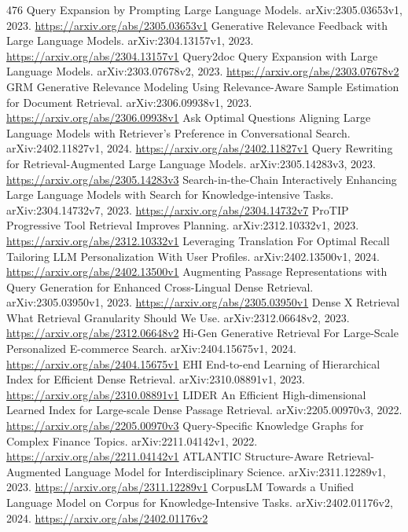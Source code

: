 \documentclass[11pt]{article}
\begin{document}
\begin{thebibliography}{476}
 Query Expansion by Prompting Large Language Models. arXiv:2305.03653v1, 2023. \url{https://arxiv.org/abs/2305.03653v1}
 Generative Relevance Feedback with Large Language Models. arXiv:2304.13157v1, 2023. \url{https://arxiv.org/abs/2304.13157v1}
 Query2doc Query Expansion with Large Language Models. arXiv:2303.07678v2, 2023. \url{https://arxiv.org/abs/2303.07678v2}
 GRM Generative Relevance Modeling Using Relevance-Aware Sample Estimation for Document Retrieval. arXiv:2306.09938v1, 2023. \url{https://arxiv.org/abs/2306.09938v1}
 Ask Optimal Questions Aligning Large Language Models with Retriever's Preference in Conversational Search. arXiv:2402.11827v1, 2024. \url{https://arxiv.org/abs/2402.11827v1}
 Query Rewriting for Retrieval-Augmented Large Language Models. arXiv:2305.14283v3, 2023. \url{https://arxiv.org/abs/2305.14283v3}
 Search-in-the-Chain Interactively Enhancing Large Language Models with Search for Knowledge-intensive Tasks. arXiv:2304.14732v7, 2023. \url{https://arxiv.org/abs/2304.14732v7}
 ProTIP Progressive Tool Retrieval Improves Planning. arXiv:2312.10332v1, 2023. \url{https://arxiv.org/abs/2312.10332v1}
 Leveraging Translation For Optimal Recall Tailoring LLM Personalization With User Profiles. arXiv:2402.13500v1, 2024. \url{https://arxiv.org/abs/2402.13500v1}
 Augmenting Passage Representations with Query Generation for Enhanced Cross-Lingual Dense Retrieval. arXiv:2305.03950v1, 2023. \url{https://arxiv.org/abs/2305.03950v1}
 Dense X Retrieval What Retrieval Granularity Should We Use. arXiv:2312.06648v2, 2023. \url{https://arxiv.org/abs/2312.06648v2}
 Hi-Gen Generative Retrieval For Large-Scale Personalized E-commerce Search. arXiv:2404.15675v1, 2024. \url{https://arxiv.org/abs/2404.15675v1}
 EHI End-to-end Learning of Hierarchical Index for Efficient Dense Retrieval. arXiv:2310.08891v1, 2023. \url{https://arxiv.org/abs/2310.08891v1}
 LIDER An Efficient High-dimensional Learned Index for Large-scale Dense Passage Retrieval. arXiv:2205.00970v3, 2022. \url{https://arxiv.org/abs/2205.00970v3}
 Query-Specific Knowledge Graphs for Complex Finance Topics. arXiv:2211.04142v1, 2022. \url{https://arxiv.org/abs/2211.04142v1}
 ATLANTIC Structure-Aware Retrieval-Augmented Language Model for Interdisciplinary Science. arXiv:2311.12289v1, 2023. \url{https://arxiv.org/abs/2311.12289v1}
 CorpusLM Towards a Unified Language Model on Corpus for Knowledge-Intensive Tasks. arXiv:2402.01176v2, 2024. \url{https://arxiv.org/abs/2402.01176v2}

\end{thebibliography}
\end{document}
